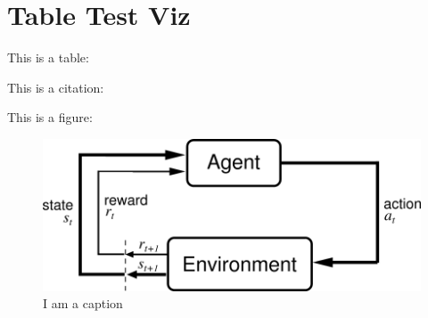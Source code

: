 


\section{Table Test Viz}

This is a table:




This is a citation: \cite{patchCore2022}


This is a figure: 

\begin{figure}[ht]
    \centering
    \includegraphics[width=.5\textwidth]{figures/AgentEnviornment.png}
    \caption{I am a caption}
    \label{fig:my_label}
\end{figure}


